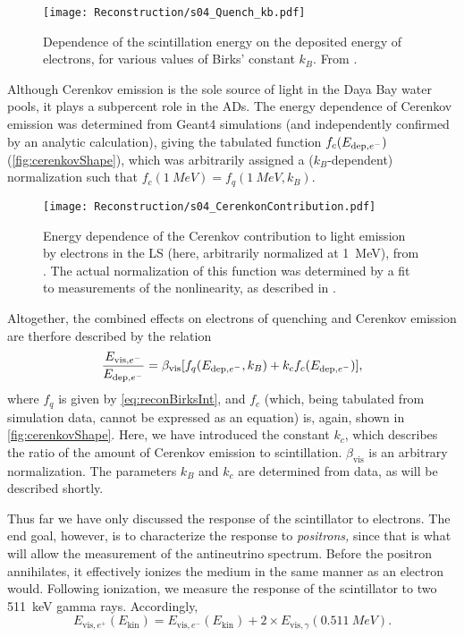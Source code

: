 \documentclass[../thesis.tex]{subfiles}
\begin{document}
\begin{figure}[h]
  \texttt{[image: Reconstruction/s04\_Quench\_kb.pdf]}
  \caption{Dependence of the scintillation energy on the deposited energy of electrons, for various values of Birks' constant $k_B$. From \cite{NonlinearityPaper}.}
  \label{fig:reconBirksInt}
\end{figure}

Although Cerenkov emission is the sole source of light in the Daya Bay water pools, it plays a subpercent role in the ADs. The energy dependence of Cerenkov emission was determined from Geant4 simulations (and independently confirmed by an analytic calculation), giving the tabulated function $f_c(E_{\mathrm{dep},e^-})$ (\autoref{fig:cerenkovShape}), which was arbitrarily assigned a ($k_B$-dependent) normalization such that $f_c(\SI{1}{MeV}) = f_q(\SI{1}{MeV}, k_B)$. 

\begin{figure}[h]
  \texttt{[image: Reconstruction/s04\_CerenkonContribution.pdf]}
  \caption{Energy dependence of the Cerenkov contribution to light emission by electrons in the LS (here, arbitrarily normalized at 1~MeV), from \cite{NonlinearityPaper}. The actual normalization of this function was determined by a fit to measurements of the nonlinearity, as described in \cite{NonlinearityPaper}.}
  \label{fig:cerenkovShape}
\end{figure}

Altogether, the combined effects on electrons of quenching and Cerenkov emission are therfore described by the relation
\begin{equation}
  \label{eq:reconScintNonlin}
  \frac{E_{\mathrm{vis},e^-}}{E_{\mathrm{dep},e^-}} = \beta_{\mathrm{vis}}[f_q(E_{\mathrm{dep},e^-}, k_B) + k_c f_c(E_{\mathrm{dep},e^-})],
\end{equation}
where $f_q$ is given by \autoref{eq:reconBirksInt}, and $f_c$ (which, being tabulated from simulation data, cannot be expressed as an equation) is, again, shown in \autoref{fig:cerenkovShape}. Here, we have introduced the constant $k_c$, which describes the ratio of the amount of Cerenkov emission to scintillation. $\beta_{\mathrm{vis}}$ is an arbitrary normalization. The parameters $k_B$ and $k_c$ are determined from data, as will be described shortly.

Thus far we have only discussed the response of the scintillator to electrons. The end goal, however, is to characterize the response to \emph{positrons,} since that is what will allow the measurement of the antineutrino spectrum. Before the positron annihilates, it effectively ionizes the medium in the same manner as an electron would. Following ionization, we measure the response of the scintillator to two 511~keV gamma rays. Accordingly,
\begin{equation}
  \label{eq:reconScintPositron}
  E_{\mathrm{vis},e^+}(E_{\mathrm{kin}}) = E_{\mathrm{vis},e^-}(E_{\mathrm{kin}}) + 2 \times E_{\mathrm{vis},\gamma}(\SI{0.511}{MeV}).
\end{equation}
\end{document}
